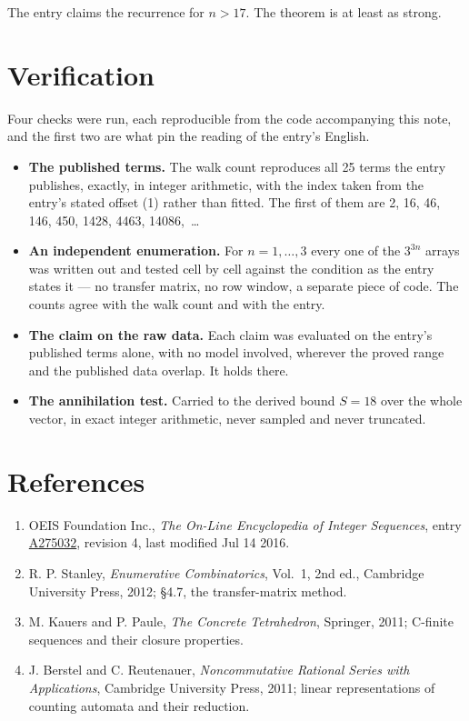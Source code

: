 \documentclass[11pt]{article}
\theoremstyle{definition}
\begin{document}
The entry claims the recurrence for $n > 17$. The theorem is at least as strong.

\section{Verification}

Four checks were run, each reproducible from the code accompanying this note, and the first two are what pin the reading of the entry's English.

\begin{itemize}

\item {\bfseries The published terms.} The walk count reproduces all 25 terms the entry publishes, exactly, in integer arithmetic, with the index taken from the entry's stated offset (1) rather than fitted. The first of them are 2, 16, 46, 146, 450, 1428, 4463, 14086,~\dots

\item {\bfseries An independent enumeration.} For $n = 1,\dots,3$ every one of the $3^{3n}$ arrays was written out and tested cell by cell against the condition as the entry states it --- no transfer matrix, no row window, a separate piece of code. The counts agree with the walk count and with the entry.

\item {\bfseries The claim on the raw data.} Each claim was evaluated on the entry's published terms alone, with no model involved, wherever the proved range and the published data overlap. It holds there.

\item {\bfseries The annihilation test.} Carried to the derived bound $S = 18$ over the whole vector, in exact integer arithmetic, never sampled and never truncated.

\end{itemize}

\section{References}

\begin{enumerate}

\item OEIS Foundation Inc., \emph{The On-Line Encyclopedia of Integer Sequences}, entry \href{https://oeis.org/A275032}{A275032}, revision 4, last modified Jul 14 2016.

\item R. P. Stanley, \emph{Enumerative Combinatorics}, Vol.~1, 2nd ed., Cambridge University Press, 2012; \S4.7, the transfer-matrix method.

\item M. Kauers and P. Paule, \emph{The Concrete Tetrahedron}, Springer, 2011; C-finite sequences and their closure properties.

\item J. Berstel and C. Reutenauer, \emph{Noncommutative Rational Series with Applications}, Cambridge University Press, 2011; linear representations of counting automata and their reduction.

\end{enumerate}
\end{document}
